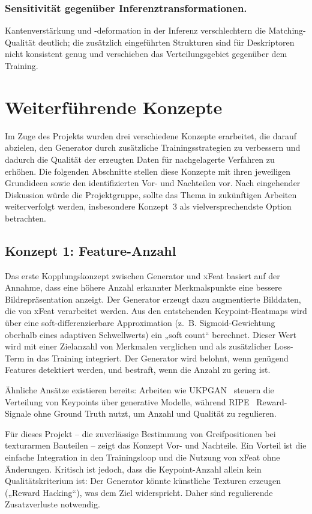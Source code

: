 \subsubsection{Sensitivität gegenüber Inferenztransformationen.} Kantenverstärkung und -deformation in der Inferenz verschlechtern die Matching-Qualität deutlich; die zusätzlich eingeführten Strukturen sind für Deskriptoren nicht konsistent genug und verschieben das Verteilungsgebiet gegenüber dem Training. \,


\section{Weiterführende Konzepte}
\label{sec:Konzepte}
Im Zuge des Projekts wurden drei verschiedene Konzepte erarbeitet, die darauf abzielen, den Generator durch 
zusätzliche Trainingsstrategien zu verbessern und dadurch die Qualität der erzeugten Daten für nachgelagerte 
Verfahren zu erhöhen. Die folgenden Abschnitte stellen diese Konzepte mit ihren jeweiligen Grundideen sowie den 
identifizierten Vor- und Nachteilen vor. Nach eingehender Diskussion würde die Projektgruppe, sollte das Thema in 
zukünftigen Arbeiten weiterverfolgt werden, insbesondere Konzept~3 als vielversprechendste Option betrachten.


\newpage
\subsection{Konzept 1: Feature-Anzahl}
\label{sec:Konzept1}
Das erste Kopplungskonzept zwischen Generator und \ac{xFeat} basiert auf der Annahme, dass eine höhere Anzahl erkannter Merkmalspunkte eine bessere Bildrepräsentation anzeigt. 
Der Generator erzeugt dazu augmentierte Bilddaten, die von \ac{xFeat} verarbeitet werden. 
Aus den entstehenden Keypoint-Heatmaps wird über eine soft-differenzierbare Approximation (z.~B. Sigmoid-Gewichtung oberhalb eines adaptiven Schwellwerts) ein „soft count“ berechnet. 
Dieser Wert wird mit einer Zielanzahl von Merkmalen verglichen und als zusätzlicher Loss-Term in das Training integriert. 
Der Generator wird belohnt, wenn genügend Features detektiert werden, und bestraft, wenn die Anzahl zu gering ist.  

Ähnliche Ansätze existieren bereits: Arbeiten wie UKPGAN~\cite{you2022ukpgan} steuern die Verteilung von Keypoints über generative Modelle, während RIPE~\cite{kunzel2025ripe} Reward-Signale ohne Ground Truth nutzt, um Anzahl und Qualität zu regulieren.  

Für dieses Projekt – die zuverlässige Bestimmung von Greifpositionen bei texturarmen Bauteilen – zeigt das Konzept Vor- und Nachteile. 
Ein Vorteil ist die einfache Integration in den Trainingsloop und die Nutzung von \ac{xFeat} ohne Änderungen. 
Kritisch ist jedoch, dass die Keypoint-Anzahl allein kein Qualitätskriterium ist: 
Der Generator könnte künstliche Texturen erzeugen („Reward Hacking“), was dem Ziel widerspricht. 
Daher sind regulierende Zusatzverluste notwendig.  

